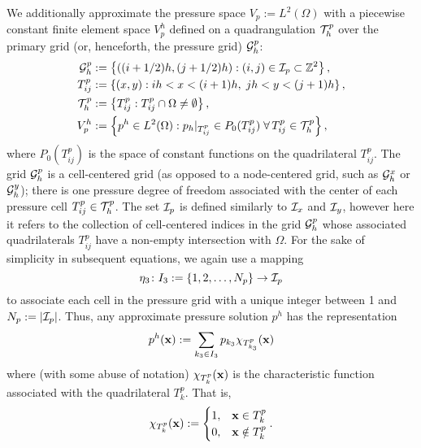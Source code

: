 We additionally approximate the pressure space $V_p := L^2(\Omega)$ with a piecewise constant finite element space $V_p^h$ defined on a quadrangulation $\mathcal{T}^p_h$ over the primary grid (or, henceforth, the pressure grid) $\mathcal{G}^p_h$:
\begin{align*}
\mathcal{G}^p_h & := \left\lbrace  ((i + 1/2)h, (j + 1/2)h) : (i,j) \in \mathcal{I}_p \subset \mathbb{Z}^2  \right\rbrace, \\
T^p_{ij} & := \left\lbrace  (x,y) : ih < x < (i+1)h, \; jh < y < (j+1)h  \right\rbrace, \\
\mathcal{T}^p_h & := \left\lbrace  T^p_{ij} : T^p_{ij} \cap \Omega \neq \emptyset  \right\rbrace, \\
V_p^h & := \left\lbrace  p^h \in L^2(\Omega) : p_h \rvert_{T^p_{ij}} \in P_0(T^p_{ij})\; \forall \, T^p_{ij} \in \mathcal{T}^p_h  \right\rbrace,
\end{align*}
where $P_0(T^p_{ij})$ is the space of constant functions on the quadrilateral $T^p_{ij}$. The grid $\mathcal{G}^p_h$ is a cell-centered grid (as opposed to a node-centered grid, such as $\mathcal{G}^x_h$ or $\mathcal{G}^y_h$); there is one pressure degree of freedom associated with the center of each pressure cell $T^p_{ij}\in \mathcal{T}^p_h$. The set $\mathcal{I}_p$ is defined similarly to $\mathcal{I}_x$ and  $\mathcal{I}_y$, however here it refers to the collection of cell-centered indices in the grid $\mathcal{G}^p_h$ whose associated quadrilaterals $T^p_{ij}$ have a non-empty intersection with $\Omega$. For the sake of simplicity in subsequent equations, we again use a mapping
\begin{equation*}
\eta_3 \colon I_3 := \{ 1, 2, \dotsc, N_p \} \to \mathcal{I}_p
\end{equation*}
to associate each cell in the pressure grid with a unique integer between 1 and $N_p := \left\lvert \mathcal{I}_p \right\rvert$. Thus, any approximate pressure solution $p^h$ has the representation
\begin{equation} \label{eq:ch5.staggeredapproximation.p}
p^h(\mathbf{x}) := \sum_{k_3 \in I_3} p_{k_3} \chi_{T^p_{k_3}}(\mathbf{x})
\end{equation}
where (with some abuse of notation) $\chi_{T^p_k}(\mathbf{x})$ is the characteristic function associated with the quadrilateral $T^p_k$. That is,
\begin{equation*}
\chi_{T^p_k}(\mathbf{x}) := \begin{cases} 1, & \mathbf{x} \in T^p_k \\ 0, & \mathbf{x} \notin T^p_k \end{cases}.
\end{equation*}

